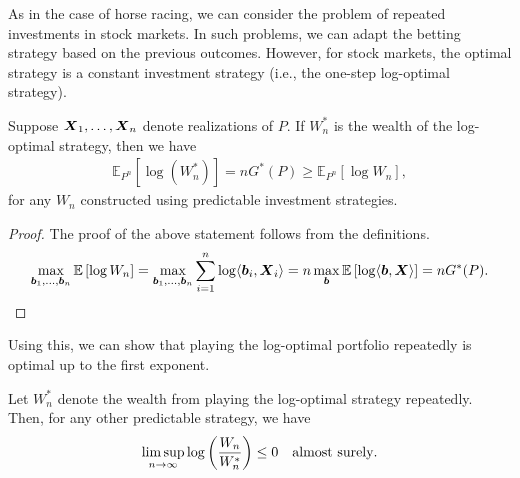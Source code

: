     As in the case of horse racing, we can consider the problem of repeated investments in stock markets. In such problems, we can adapt the betting strategy based on the previous outcomes. However, for \iid stock markets, the optimal strategy is a constant investment strategy (i.e., the one-step log-optimal strategy). 

    \begin{proposition}
        \label{prop:iid-stock-market} Suppose $\boldsymbol{X}_1, \ldots, \boldsymbol{X}_n$ denote \iid realizations of $P$. If $W^*_n$ is the wealth of the log-optimal strategy, then we have 
        \begin{align}
            \mathbb{E}_{P^n}[\log(W^*_n)] = n G^*(P) \geq \mathbb{E}_{P^n}[\log W_n], 
        \end{align}
        for any $W_n$ constructed using predictable investment strategies. 
    \end{proposition}
    \begin{proof}
        The proof of the above statement follows from the definitions. 
        \begin{align}
            \max_{\boldsymbol{b}_1, \ldots, \boldsymbol{b}_n} \mathbb{E}\left[ \log W_n \right] = \max_{\boldsymbol{b}_1, \ldots, \boldsymbol{b}_n} \sum_{i=1}^n \log \langle \boldsymbol{b}_i, \boldsymbol{X}_i \rangle  
             = n \max_{\boldsymbol{b}} \mathbb{E}\left[ \log \langle \boldsymbol{b}, \boldsymbol{X} \rangle \right] = nG^*(P). 
        \end{align}
    \end{proof}
    Using this, we can show that playing the log-optimal portfolio repeatedly is optimal up to the first exponent. 
    \begin{proposition}
        \label{prop:log-optimal-first-order} Let $W_n^*$ denote the wealth from playing the log-optimal strategy repeatedly. Then, for any other predictable strategy, we have 
        \begin{align}
            \limsup_{n \to \infty} \log \left( \frac{W_n}{W_n^*} \right) \leq 0 \quad \text{almost surely}. 
        \end{align}
    \end{proposition}
